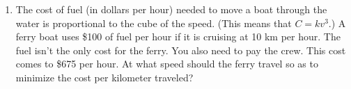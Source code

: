 \documentclass[12pt]{article}
\begin{document}
\begin{enumerate}
\item The cost of fuel (in dollars per hour) needed to move a boat
  through the water is proportional to the cube of the speed.  (This
  means that $C=kv^3$.)  A ferry boat uses \$100 of fuel per hour if
  it is cruising at 10 km per hour.  The fuel isn't the only cost for
  the ferry. You also need to pay the crew. This cost comes to \$675
  per hour. At what speed should the ferry travel so as to minimize
  the cost per kilometer traveled? 
  
\end{enumerate}
\end{document}
